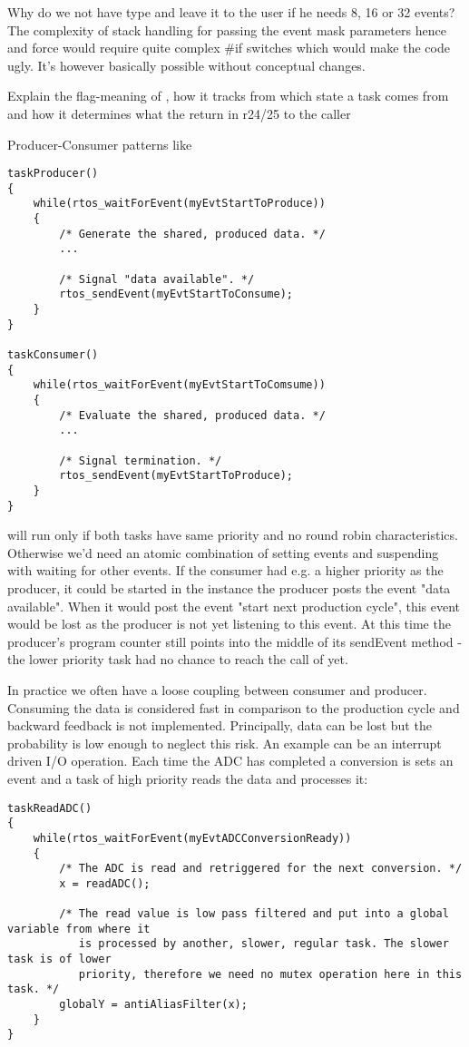 Why do we not have type  and leave it to the user if he needs
8, 16 or 32 events? The complexity of stack handling for passing the event
mask parameters hence and force would require quite complex \#if switches
which would make the code ugly. It's however basically possible without
conceptual changes.

Explain the flag-meaning of , how it tracks from which
state a task comes from and how it determines what the return in r24/25 to
the caller

Producer-Consumer patterns like
\begin{lstlisting}[float, caption={Deadlock situation in a producer/consumer implementation},
label=lstProducerConsumer, captionpos=b]
taskProducer()
{
    while(rtos_waitForEvent(myEvtStartToProduce))
    {
        /* Generate the shared, produced data. */
        ...

        /* Signal "data available". */
        rtos_sendEvent(myEvtStartToConsume);
    }
}

taskConsumer()
{
    while(rtos_waitForEvent(myEvtStartToComsume))
    {
        /* Evaluate the shared, produced data. */
        ...

        /* Signal termination. */
        rtos_sendEvent(myEvtStartToProduce);
    }
}
\end{lstlisting}
will run only if both tasks have same priority and no round robin characteristics.
Otherwise we'd need an atomic combination of setting events and suspending with waiting for
other events. If the consumer had e.g. a higher priority as the producer, it could be
started in the instance the producer posts the event "data available". When it would post
the event "start next production cycle", this event would be lost as the producer is not
yet listening to this event. At this time the producer's program counter still points into
the middle of its sendEvent method - the lower priority task had no chance to reach the call
of  yet.

In practice we often have a loose coupling between consumer and producer. Consuming the
data is considered fast in comparison to the production cycle and backward feedback is not
implemented. Principally, data can be lost but the probability is low enough to neglect
this risk. An example can be an interrupt driven I/O operation. Each time the ADC has
completed a conversion is sets an event and a task of high priority reads the data and
processes it:
\begin{lstlisting}[float, caption=Usage of application interrupts,
label=lstSampleISRForADC, captionpos=b]
taskReadADC()
{
    while(rtos_waitForEvent(myEvtADCConversionReady))
    {
        /* The ADC is read and retriggered for the next conversion. */
        x = readADC();
        
        /* The read value is low pass filtered and put into a global variable from where it
           is processed by another, slower, regular task. The slower task is of lower
           priority, therefore we need no mutex operation here in this task. */
        globalY = antiAliasFilter(x);
    }        
}
\end{lstlisting}


